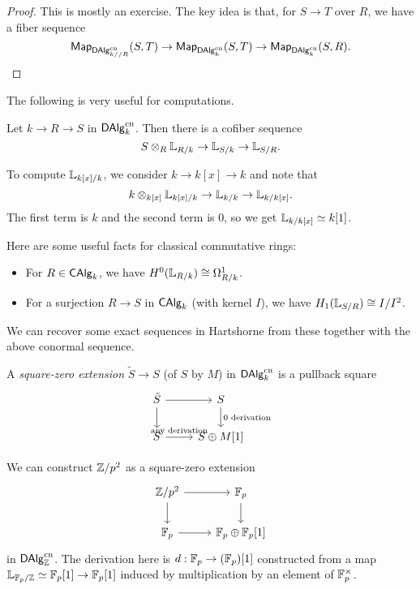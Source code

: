 \documentclass{amsart}
\begin{document}
\begin{proof}
	This is mostly an exercise.
	The key idea is that, for $S \to T$ over $R$, we have a fiber sequence
	\[
		\mathsf{Map}_{\mathsf{DAlg}_{k//R}^{\mathrm{cn}}}(S, T) \to \mathsf{Map}_{\mathsf{DAlg}_k^{\mathrm{cn}}}(S, T) \to \mathsf{Map}_{\mathsf{DAlg}_k^{\mathrm{cn}}}(S, R).
	\]
\end{proof}

The following is very useful for computations.

\begin{exer}
	Let $k \to R \to S$ in $\mathsf{DAlg}_k^{\mathrm{cn}}$.
	Then there is a cofiber sequence
	\[
		S \otimes_R \mathbb{L}_{R/k} \to \mathbb{L}_{S/k} \to \mathbb{L}_{S/R}.
	\]
\end{exer}

\begin{ex}
	To compute $\mathbb{L}_{k[x]/k}$, we consider $k \to k[x] \to k$ and note that
	\[
		k \otimes_{k[x]} \mathbb{L}_{k[x]/k} \to \mathbb{L}_{k/k} \to \mathbb{L}_{k/k[x]}.
	\]
	The first term is $k$ and the second term is $0$, so we get $\mathbb{L}_{k/k[x]} \simeq k[1]$.
\end{ex}

Here are some useful facts for classical commutative rings:
\begin{itemize}
	\item For $R \in \mathsf{CAlg}_k$, we have $H^0(\mathbb{L}_{R/k}) \cong \Omega^1_{R/k}$.
	\item For a surjection $R \to S$ in $\mathsf{CAlg}_k$ (with kernel $I$), we have $H_1(\mathbb{L}_{S/R}) \cong I / I^2$.
\end{itemize}
We can recover some exact sequences in Hartshorne from these together with the above conormal sequence.

\begin{dfn}
	A \emph{square-zero extension} $\tilde{S} \to S$ (of $S$ by $M$) in $\mathsf{DAlg}_k^{\mathrm{cn}}$ is a pullback square
	\[
		\begin{tikzcd}
			\tilde{S} \rar \dar & S \dar["0 \textrm{ derivation}"] \\
			S \rar["\textrm{any derivation}"] & S \oplus M[1]
		\end{tikzcd}
	\]
\end{dfn}

\begin{ex}
	We can construct $\mathbb{Z} / p^2$ as a square-zero extension
	\[
		\begin{tikzcd}
			\ZZ / p^2 \rar \dar & \FF_p \dar \\
			\FF_p \rar & \FF_p \oplus \FF_p [1]
		\end{tikzcd}
	\]
	in $\mathsf{DAlg}_{\mathbb{Z}}^{\mathrm{cn}}$.
	The derivation here is $d: \mathbb{F}_p \to (\mathbb{F}_p)[1]$ constructed from a map $\mathbb{L}_{\mathbb{F}_p/\mathbb{Z}} \simeq \mathbb{F}_p[1] \to \mathbb{F}_p[1]$ induced by multiplication by an element of $\mathbb{F}_p^\times$.
\end{ex}
\end{document}
